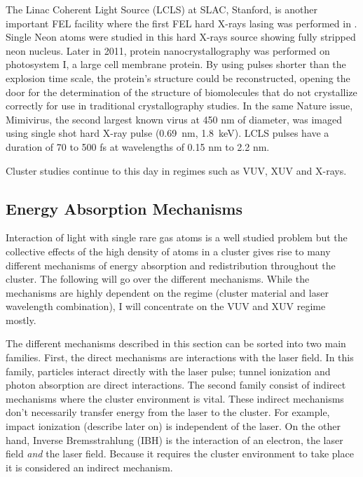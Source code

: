 The Linac Coherent Light Source (LCLS) at SLAC, Stanford, is another important
FEL facility where the first FEL hard X-rays lasing was performed in
\cite{Emma2010,Schneider2010}. Single Neon atoms were studied in
this hard X-rays source\cite{Young2010} showing fully stripped neon nucleus.
Later in 2011, protein nanocrystallography was performed \cite{Chapman2011}
on photosystem I, a large cell membrane protein. By using pulses shorter
than the explosion time scale, the protein's structure could be reconstructed,
opening the door for the determination of the structure of biomolecules that
do not crystallize correctly for use in traditional crystallography studies.
In the same Nature issue, Mimivirus, the second largest known virus at 450 nm
of diameter, was imaged using single shot hard X-ray pulse (0.69~nm,
1.8~keV)\cite{Seibert2011}. LCLS pulses have a duration of 70 to 500 fs at
wavelengths of 0.15 nm to 2.2 nm\cite{Pellegrini2011}.

Cluster studies continue to this day in regimes such as VUV\cite{Arbeiter2011},
XUV\cite{Murphy2008a,Murphy2008b,Krikunova2012} and X-rays\cite{Ziaja2009b}.




\subsection{Energy Absorption Mechanisms}
\label{section:intro:clusters:heating}
Interaction of light with single rare gas atoms is a well studied problem but the
collective effects of the high density of atoms in a cluster gives rise to many
different mechanisms of energy absorption and redistribution throughout the
cluster. The following will go over the different mechanisms. While the
mechanisms are highly dependent on the regime (cluster material and
laser wavelength combination), I will concentrate on the VUV and XUV
regime mostly.

The different mechanisms described in this section can be sorted into two main
families. First, the direct mechanisms are interactions with the laser field.
In this family, particles interact directly with the laser pulse;
tunnel ionization and photon absorption are direct interactions. The second
family consist of indirect mechanisms where the cluster environment is vital.
These indirect mechanisms don't necessarily transfer energy from the laser to
the cluster. For example, impact ionization (describe later on) is independent
of the laser. On the other hand, Inverse Bremsstrahlung (IBH) is the interaction
of an electron, the laser field \textit{and} the laser field. Because it
requires the cluster environment to take place it is considered an indirect
mechanism.

